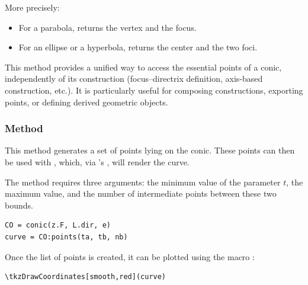   \medskip

  More precisely:
  \begin{itemize}
    \item For a parabola,  returns the vertex and the focus.
    \item For an ellipse or a hyperbola,  returns the center and the two foci.
  \end{itemize}

  This method provides a unified way to access the essential points of a conic, independently of its construction (focus--directrix definition, axis-based construction, etc.). It is particularly useful for composing constructions, exporting points, or defining derived geometric objects.


\subsubsection{Method }
\label{ssub:method_conic_points}

This method generates a set of points lying on the conic. These points can then be used with , which, via \TIKZ{}'s , will render the curve.

The method requires three arguments: the minimum value of the parameter $t$, the maximum value, and the number of intermediate points between these two bounds.

\begin{mybox}
  \begin{verbatim}
CO = conic(z.F, L.dir, e)
curve = CO:points(ta, tb, nb)
  \end{verbatim}
\end{mybox}

Once the list of points is created, it can be plotted using the macro :

\begin{mybox}
  \begin{verbatim}
\tkzDrawCoordinates[smooth,red](curve)
  \end{verbatim}
\end{mybox}

